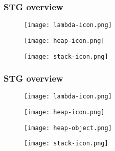 \documentclass[bigger,aspectratio=169]{beamer}
\begin{document}
\begin{frame}[fragile]
\frametitle{STG overview}
\begin{center}

	\begin{minipage}{0.30\textwidth}
		\begin{figure}
			\texttt{[image: lambda-icon.png]}
		\end{figure}
	\end{minipage}
	\hfill
	\begin{minipage}{0.30\textwidth}
		\begin{figure}
			\texttt{[image: heap-icon.png]}
		\end{figure}
	\end{minipage}
	\hfill
	\begin{minipage}{0.30\textwidth}
		\begin{figure}
			\texttt{[image: stack-icon.png]}
		\end{figure}
	\end{minipage}

\end{center}
\end{frame}

\begin{frame}[fragile]
\frametitle{STG overview}
\begin{center}

	\begin{minipage}{0.30\textwidth}
		\begin{figure}
			\texttt{[image: lambda-icon.png]}
		\end{figure}
	\end{minipage}
	\hfill
	\begin{minipage}{0.30\textwidth}
		\vspace{1cm}
		\begin{figure}
			\texttt{[image: heap-icon.png]}
		\end{figure}
		\vspace{-1cm}
		\begin{figure}
			\texttt{[image: heap-object.png]}
		\end{figure}
	\end{minipage}
	\hfill
	\begin{minipage}{0.30\textwidth}
		\begin{figure}
			\texttt{[image: stack-icon.png]}
		\end{figure}
	\end{minipage}

\end{center}
\end{frame}
\end{document}
